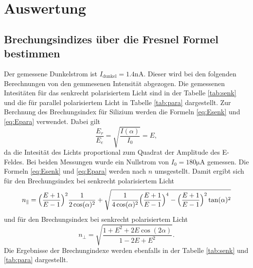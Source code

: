\section{Auswertung}
\label{sec:Auswertung}

\subsection{Brechungsindizes über die Fresnel Formel bestimmen}
Der gemessene Dunkelstrom ist $I_\text{dunkel} = 1.4 \unit{\nano\ampere}$. Dieser wird bei den folgenden Berechnungen von den gemmesenen Intensität abgezogen.
Die gemessenen Intesitäten für das senkrecht polarisiertem Licht sind in der Tabelle \ref{tab:senk} und 
die für parallel polarisiertem Licht in Tabelle \ref{tab:para} dargestellt.
Zur Berchnung des Brechungsindex für Silizium werden die Formeln \ref{eq:Esenk} und \ref{eq:Epara} verwendet.
Dabei gilt 
\begin{equation*}
  \frac{E_r}{E_e} = \sqrt{\frac{I(\alpha)}{I_0}} = E,
\end{equation*}
da die Intesität des Lichts proportional zum Quadrat der Amplitude des E-Feldes.
Bei beiden Messungen wurde ein Nullstrom von $I_0 = 180 \unit{\micro\ampere}$ gemessen.
Die Formeln \ref{eq:Esenk} und \ref{eq:Epara} werden nach $n$ umsgestellt.
Damit ergibt sich für den Brechungsindex bei senkrecht polarisiertem Licht
\begin{equation}
  n_\parallel = \Bigl(\frac{E+1}{E-1}\Bigr)^2\frac{1}{2 \cos(\alpha)^2}+\sqrt{\frac{1}{4 \cos(\alpha)^2}\Bigl(\frac{E+1}{E-1}\Bigr)^4-\Bigl(\frac{E+1}{E-1}\Bigr)^2 \tan(\alpha)^2}
\end{equation}
und für den Brechungsindex bei senkrecht polarisiertem Licht
\begin{equation}
  n_\perp = \sqrt{\frac{1+ E^2+ 2 E \cos(2 \alpha)}{1- 2 E+ E^2}}.
\end{equation}
Die Ergebnisse der Brechungindexe werden ebenfalls in der Tabelle \ref{tab:senk} und \ref{tab:para} dargestellt.
